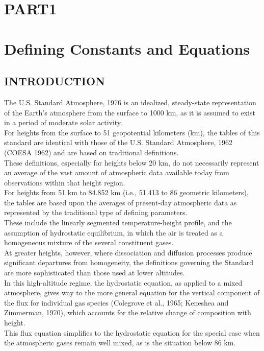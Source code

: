 \documentclass{article}
\begin{document}
\begin{center}
  \section*{PART1}
  \section*{Defining Constants and Equations}
\end{center}
\setcounter{section}{1}
\setcounter{subsection}{-1}
\subsection{INTRODUCTION}
The U.S. Standard Atmosphere, 1976 is an idealized, steady-state representation of the Earth's atmosphere from the surface to 1000 km, as it is assumed to exist in a period of moderate solar activity.\\

For heights from the surface to 51 geopotential kilometers (km), the tables of this standard are identical with those of the U.S. Standard Atmosphere, 1962 (COESA 1962) and are based on traditional definitions.\\
These definitions, especially for heights below 20 km, do not necessarily represent an average of the vast amount of atmospheric data available today from observations within that height region.\\

For heights from 51 km to 84.852 km (i.e., 51.413 to 86 geometric kilometers), the tables are based upon the averages of present-day atmospheric data as represented by the traditional type of defining parameters.\\
These include the linearly segmented temperature-height profile, and the assumption of hydrostatic equilibrium, in which the air is treated as a homogeneous mixture of the several constituent gases.\\

At greater heights, however, where dissociation and diffusion processes produce significant departures from homogeneity, the definitions governing the Standard are more sophisticated than those used at lower altitudes.\\

In this high-altitude regime, the hydrostatic equation, as applied to a mixed atmosphere, gives way to the more general equation for the vertical component of the flux for individual gas species (Colegrove et al., 1965; Keneshea and Zimmerman, 1970), which accounts for the relative change of composition with height.\\
This flux equation simplifies to the hydrostatic equation for the special case when the atmospheric gases remain well mixed, as is the situation below 86 km.\\
\end{document}
